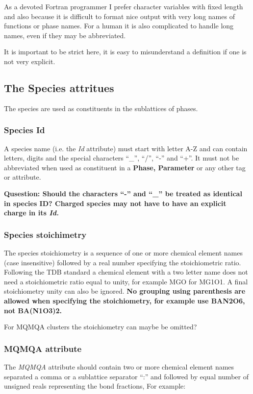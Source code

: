 \documentclass{article}
\begin{document}
As a devoted Fortran programmer I prefer character variables with
fixed length and also because it is difficult to format nice output
with very long names of functions or phase names.  For a human it is
also complicated to handle long names, even if they may be
abbreviated.

It is important to be strict here, it is easy to misunderstand a
definition if one is not very explicit.

\subsection{The Species attritues}

The species are used as constituents in the sublattices of phases.

\subsubsection{Species Id}\label{sec:speciesID}
A species name (i.e. the {\em Id}
attribute) must start with letter A-Z and can contain letters,
digits and the special characters ``\_'', ``/'', ``-'' and ``+''.
It must not be abbreviated when used as constituent in a {\bf Phase,
  Parameter} or any other tag or attribute.

{\bf Qusestion: Should the characters ``-'' and ``\_'' be treated as
  identical in species ID?  Charged species may not have to have an
  explicit charge in its {\em Id.}}

\subsubsection{Species stoichimetry}\label{sec:speciesSS}
The species stoichiometry is a sequence of one or more chemical
element names (case insensitive) followed by a real number specifying
the stoichiometric ratio.  Following the TDB standard a chemical
element with a two letter name does not need a stoichiometric ratio
equal to unity, for example MGO for MG1O1.  A final stoichiometry
unity can also be ignored.  {\bf No grouping using parenthesis are
  allowed when specifying the stoichiometry, for example use BAN2O6,
  not BA(N1O3)2.}

For MQMQA clusters the stoichiometry can maybe be omitted?

\subsubsection{MQMQA attribute}\label{sec:mqmqa}
The {\em MQMQA} attribute should contain two or more chemical element
names separated a comma or a sublattice separator ``:'' and followed
by equal number of unsigned reals representing the bond fractions, For
example:
\end{document}
